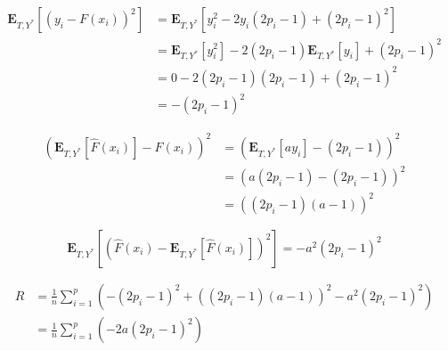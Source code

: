 \documentclass{article}
\begin{document}
\begin{align*}
\mathbf{E}_{T,Y^*}\left[(y_i-F(x_i))^2 \right] & = \mathbf{E}_{T,Y^*}\left[y_i^2-2y_i(2p_i-1)+(2p_i-1)^2\right]
\\
& = \mathbf{E}_{T,Y^*}\left[y_i^2 \right]-2(2p_i-1)\mathbf{E}_{T,Y^*}\left[y_i \right]+(2p_i-1)^2
\\
& = 0 -2(2p_i-1)(2p_i-1)+(2p_i-1)^2
\\
& = -(2p_i-1)^2
\end{align*}

\begin{align*}
\left(\mathbf{E}_{T,Y^*}\left[\hat{F}(x_i)\right]-F(x_i)\right)^2 & = \left(\mathbf{E}_{T,Y^*}\left[ay_i\right]-(2p_i-1)\right)^2
\\
& = \left(a(2p_i-1)-(2p_i-1)\right)^2
\\
& = \left((2p_i-1)(a-1)\right)^2
\end{align*}

\begin{equation*}
\mathbf{E}_{T,Y^*}\left[\left(\hat{F}(x_i)-\mathbf{E}_{T,Y^*}\left[\hat{F}(x_i)\right]\right)^2\right] = -a^2(2p_i-1)^2
\end{equation*}

\begin{align*}
R & = \frac{1}{n}\sum_{i=1}^p \left(-(2p_i-1)^2 + \left((2p_i-1)(a-1)\right)^2-a^2(2p_i-1)^2 \right)
\\
& = \frac{1}{n}\sum_{i=1}^p\left(-2a(2p_i-1)^2\right)
\end{align*}
\end{document}
